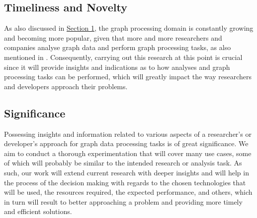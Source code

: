 \documentclass[a4paper,11pt]{article}
\begin{document}

\subsection{Timeliness and Novelty}

\par As also discussed in \hyperref[introduction]{Section 1}, the graph processing domain is constantly growing and becoming more popular, given that more and more researchers and companies analyse graph data and perform graph processing tasks, as also mentioned in \cite{facebook-trillion, twitter-sentiment}. Consequently, carrying out this research at this point is crucial since it will provide insights and indications as to how analyses and graph processing tasks can be performed, which will greatly impact the way researchers and developers approach their problems.


\subsection{Significance}



\par Possessing insights and information related to various aspects of a researcher's or developer's approach for graph data processing tasks is of great significance. We aim to conduct a thorough experimentation that will cover many use cases, some of which will probably be similar to the intended research or analysis task. As such, our work will extend current research with deeper insights and will help in the process of the decision making with regards to the chosen technologies that will be used, the resources required, the expected performance, and others, which in turn will result to better approaching a problem and providing more timely and efficient solutions.


\end{document}

